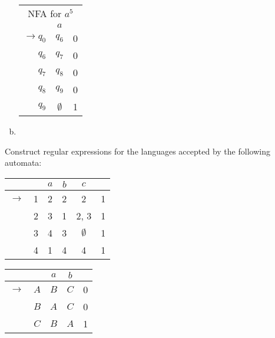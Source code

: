 \begin{solution}
\begin{enumerate}[(a)]
\begin{center}\begin{tabular}[t]{r| c r}
    \multicolumn{3}{c}{NFA for $a^5$}\\
    & $a$ & \\\hline
    $\to q_0$ & $q_6$ & 0\\
    $q_6$ & $q_7$ & 0\\
    $q_7$ & $q_8$ & 0\\
    $q_8$ & $q_9$ & 0\\
    $q_9$ & $\emptyset$ & 1              
\end{tabular}\end{center}
\item 
\end{enumerate}
\end{solution}
\begin{exercise}{4}
Construct regular expressions for the languages accepted by the following automata:
\begin{enumerate}[(a)]
\begin{multicols}{2}
    \item \begin{tabular}[t]{c c| c c c c}
         & & $a$ & $b$ & $c$ & \\\hline
         $\to$ & 1 & 2 & 2 & 2 & 1\\
               & 2 & 3 & 1 & 2, 3 & 1\\
               & 3 & 4 & 3 & $\emptyset$ & 1\\
               & 4 & 1 & 4 & 4 & 1
    \end{tabular}
    \item \begin{tabular}[t]{c c| c c c}
         & & $a$ & $b$ & \\\hline
         $\to$ & $A$ & $B$ & $C$ & 0\\
               & $B$ & $A$ & $C$ & 0\\
               & $C$ & $B$ & $A$ & 1 
    \end{tabular}
\end{multicols}
\end{enumerate}
\end{exercise}

